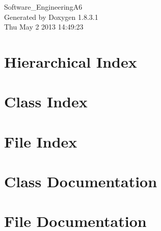 \documentclass{book}
\begin{document}
\hypersetup{pageanchor=false,citecolor=blue}
\begin{titlepage}
\vspace*{7cm}
\begin{center}
{\Large Software\-\_\-\-Engineering\-A6 }\\
\vspace*{1cm}
{\large Generated by Doxygen 1.8.3.1}\\
\vspace*{0.5cm}
{\small Thu May 2 2013 14:49:23}\\
\end{center}
\end{titlepage}
\clearemptydoublepage
{}
\tableofcontents
\clearemptydoublepage
{}
\hypersetup{pageanchor=true,citecolor=blue}
\chapter{Hierarchical Index}

\chapter{Class Index}

\chapter{File Index}

\chapter{Class Documentation}



























\chapter{File Documentation}




























\printindex
\end{document}
